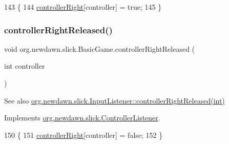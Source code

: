 \begin{DoxyCode}
143                                                        \{
144         \mbox{\hyperlink{classorg_1_1newdawn_1_1slick_1_1_basic_game_a63084cb6b54023c5c9dc4f27aa611e38}{controllerRight}}[controller] = \textcolor{keyword}{true};
145     \}
\end{DoxyCode}
\mbox{\label{classorg_1_1newdawn_1_1slick_1_1_basic_game_a84adeb6342b970209d965415b8d23162}} 
\subsubsection{\texorpdfstring{controller\+Right\+Released()}{controllerRightReleased()}}
{\footnotesize\ttfamily void org.\+newdawn.\+slick.\+Basic\+Game.\+controller\+Right\+Released (\begin{DoxyParamCaption}\item[{int}]{controller }\end{DoxyParamCaption})\hspace{0.3cm}{\ttfamily [inline]}}

\begin{DoxySeeAlso}{See also}
\mbox{\hyperlink{interfaceorg_1_1newdawn_1_1slick_1_1_controller_listener_a33ee418e010e69783169b3f52fb62c3b}{org.\+newdawn.\+slick.\+Input\+Listener\+::controller\+Right\+Released(int)}} 
\end{DoxySeeAlso}


Implements \mbox{\hyperlink{interfaceorg_1_1newdawn_1_1slick_1_1_controller_listener_a33ee418e010e69783169b3f52fb62c3b}{org.\+newdawn.\+slick.\+Controller\+Listener}}.


\begin{DoxyCode}
150                                                         \{
151         \mbox{\hyperlink{classorg_1_1newdawn_1_1slick_1_1_basic_game_a63084cb6b54023c5c9dc4f27aa611e38}{controllerRight}}[controller] = \textcolor{keyword}{false};
152     \}
\end{DoxyCode}
\mbox{\label{classorg_1_1newdawn_1_1slick_1_1_basic_game_a56128159ddf4514b79fe5fda77d4e97b}} 
